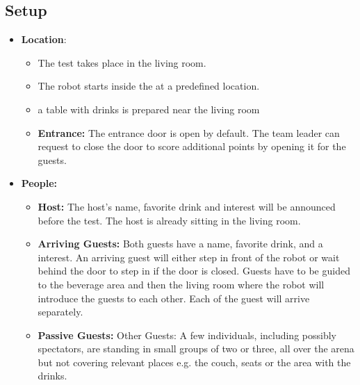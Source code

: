 \subsection*{Setup}
\begin{itemize}
	\item \textbf{Location}: 
	\begin{itemize}
	\item The test takes place in the living room.	
	\item The robot starts inside the \Arena{} at a predefined location.
	\item a table with drinks is prepared near the living room
	\item \textbf{Entrance:} The entrance door is open by default. The team leader can request to close the door to score additional points by opening it for the guests.
	\end{itemize}
	
	\item \textbf{People:} 
	\begin{itemize}
	\item \textbf{Host:} The host's name, favorite drink and interest will be announced before the test. The host is already sitting in the living room.

	\item \textbf{Arriving Guests:} Both guests have a name, favorite drink, and a interest. An arriving guest will either step in front of the robot or wait behind the door to step in if the door is closed. Guests have to be guided to the beverage area and then the living room where the robot will introduce the guests to each other. Each of the guest will arrive separately. 
	
	\item \textbf{Passive Guests:} Other Guests: A few individuals, including possibly spectators, are standing in small groups of two or three, all over the arena but not covering relevant places e.g. the couch, seats or the area with the drinks.
	\end{itemize}

\end{itemize}

